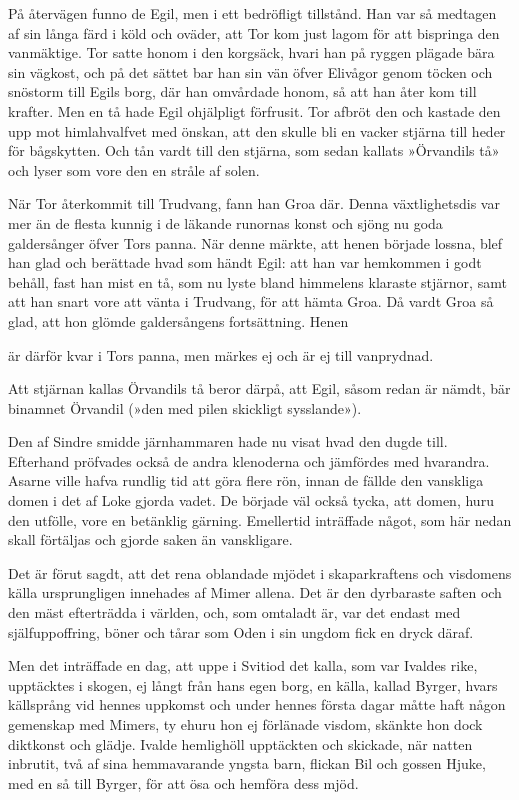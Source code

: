 På återvägen funno de Egil, men i ett bedröfligt tillstånd. Han var så
medtagen af sin långa färd i köld och oväder, att Tor kom just lagom för
att bispringa den vanmäktige. Tor satte honom i den korgsäck, hvari han
på ryggen plägade bära sin vägkost, och på det sättet bar han sin vän
öfver Elivågor genom töcken och snöstorm till Egils borg, där han
omvårdade honom, så att han åter kom till krafter. Men en tå hade Egil
ohjälpligt förfrusit. Tor afbröt den och kastade den upp mot
himlahvalfvet med önskan, att den skulle bli en vacker stjärna till
heder för bågskytten. Och tån vardt till den stjärna, som sedan kallats
»Örvandils tå» och lyser som vore den en stråle af solen.

När Tor återkommit till Trudvang, fann han Groa där. Denna
växtlighetsdis var mer än de flesta kunnig i de läkande runornas konst
och sjöng nu goda galdersånger öfver Tors panna. När denne märkte, att
henen började lossna, blef han glad och berättade hvad som händt Egil:
att han var hemkommen i godt behåll, fast han mist en tå, som nu lyste
bland himmelens klaraste stjärnor, samt att han snart vore att vänta i
Trudvang, för att hämta Groa. Då vardt Groa så glad, att hon glömde
galdersångens fortsättning. Henen

är därför kvar i Tors panna, men märkes ej och är ej till vanprydnad.

Att stjärnan kallas Örvandils tå beror därpå, att Egil, såsom redan är
nämdt, bär binamnet Örvandil (»den med pilen skickligt sysslande»).

Den af Sindre smidde järnhammaren hade nu visat hvad den dugde till.
Efterhand pröfvades också de andra klenoderna och jämfördes med
hvarandra. Asarne ville hafva rundlig tid att göra flere rön, innan de
fällde den vanskliga domen i det af Loke gjorda vadet. De började väl
också tycka, att domen, huru den utfölle, vore en betänklig gärning.
Emellertid inträffade något, som här nedan skall förtäljas och gjorde
saken än vanskligare.



Det är förut sagdt, att det rena oblandade mjödet i skaparkraftens och
visdomens källa ursprungligen innehades af Mimer allena. Det är den
dyrbaraste saften och den mäst efterträdda i världen, och, som omtaladt
är, var det endast med själfuppoffring, böner och tårar som Oden i sin
ungdom fick en dryck däraf.

Men det inträffade en dag, att uppe i Svitiod det kalla, som var Ivaldes
rike, upptäcktes i skogen, ej långt från hans egen borg, en källa,
kallad Byrger, hvars källsprång vid hennes uppkomst och under hennes
första dagar måtte haft någon gemenskap med Mimers, ty ehuru hon ej
förlänade visdom, skänkte hon dock diktkonst och glädje. Ivalde
hemlighöll upptäckten och skickade, när natten inbrutit, två af sina
hemmavarande yngsta barn, flickan Bil och gossen Hjuke, med en så till
Byrger, för att ösa och hemföra dess mjöd.

